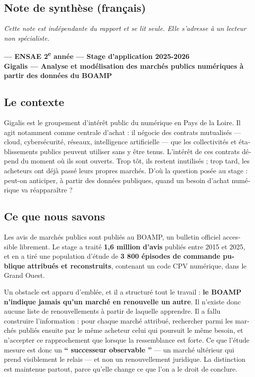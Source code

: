 \begin{otherlanguage}{french}
\section*{Note de synthèse (français)}

\emph{Cette note est indépendante du rapport et se lit seule. Elle s'adresse à un lecteur non spécialiste.}

\textbf{\studentName{} --- ENSAE 2\textsuperscript{e} année --- Stage d'application 2025-2026}\\
\textbf{Gigalis --- Analyse et modélisation des marchés publics numériques à partir des données du BOAMP}

\subsection*{Le contexte}

Gigalis est le groupement d'intérêt public du numérique en Pays de la Loire. Il agit notamment comme centrale d'achat : il négocie des contrats mutualisés --- cloud, cybersécurité, réseaux, intelligence artificielle --- que les collectivités et établissements publics peuvent utiliser sans y être tenus. L'intérêt de ces contrats dépend du moment où ils sont ouverts. Trop tôt, ils restent inutilisés ; trop tard, les acheteurs ont déjà passé leurs propres marchés. D'où la question posée au stage : peut-on anticiper, à partir des données publiques, quand un besoin d'achat numérique va réapparaître ?

\subsection*{Ce que nous savons}

Les avis de marchés publics sont publiés au BOAMP, un bulletin officiel accessible librement. Le stage a traité \textbf{1,6 million d'avis} publiés entre 2015 et 2025, et en a tiré une population d'étude de \textbf{3 800 épisodes de commande publique attribués et reconstruits}, contenant un code CPV numérique, dans le Grand Ouest.

Un obstacle est apparu d'emblée, et il a structuré tout le travail : \textbf{le BOAMP n'indique jamais qu'un marché en renouvelle un autre}. Il n'existe donc aucune liste de renouvellements à partir de laquelle apprendre. Il a fallu construire l'information : pour chaque marché attribué, rechercher parmi les marchés publiés ensuite par le même acheteur celui qui poursuit le même besoin, et n'accepter ce rapprochement que lorsque la ressemblance est forte. Ce que l'étude mesure est donc un \textbf{`` successeur observable ''} --- un marché ultérieur qui prend visiblement le relais --- et non un renouvellement juridique. La distinction est maintenue partout, parce qu'elle change ce que l'on a le droit de conclure.


\end{otherlanguage}
